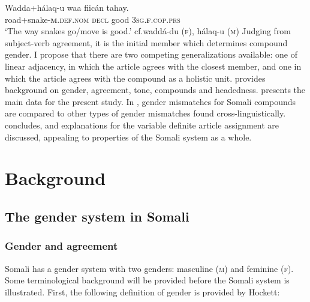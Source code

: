 \documentclass[output=paper]{langscibook}
\begin{document}
\ea\label{ex:kaldhol:intro}
	\gll Wadda+hálaq-u waa fiicán tahay.\\
	road+snake-\textsc{\textbf{m}.def.nom} \textsc{decl} good \textsc{3sg.\textbf{f}}.\textsc{cop.prs}\\
	\glt `The way snakes go/move is good.' \hfill{ cf.\@ waddá-du (\textsc{f}), hálaq-u (\textsc{m})}
\z
Judging from subject-verb agreement, it is the initial member which determines compound gender. I propose that there are two competing generalizations available: one of linear adjacency, in which the article agrees with the closest member, and one in which the article agrees with the compound as a holistic unit.  provides background on gender, agreement, tone, compounds and headedness.  presents the main data for the present study. In , gender mismatches for Somali compounds are compared to other types of gender mismatches found cross-linguistically.  concludes, and explanations for the variable definite article assignment are discussed, appealing to properties of the Somali system as a whole.

\section{Background}\label{sec:kaldhol:background}
\subsection{The gender system in Somali}\label{sec:kaldhol:gendersystem}
\subsubsection{Gender and agreement}\label{sec:kaldhol:agr}
Somali has a gender system with two genders: masculine (\textsc{m}) and feminine (\textsc{f}). Some terminological background will be provided before the Somali system is illustrated. First, the following definition of gender is provided by Hockett:
\end{document}
